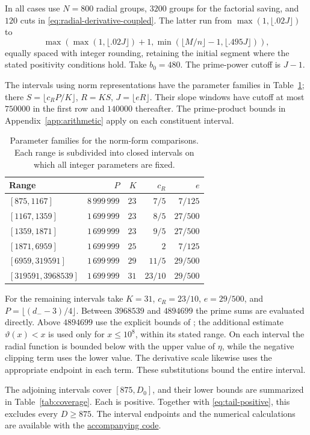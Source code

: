 In all cases use $N=800$ radial groups, $3200$ groups for the factorial
saving, and $120$ cuts in \eqref{eq:radial-derivative-coupled}.
The latter run from $\max(1,\lfloor.02J\rfloor)$ to
\[
 \max\left(\max(1,\lfloor.02J\rfloor)+1,
       \min(\lfloor M/n\rfloor-1,\lfloor.495J\rfloor)\right),
\]
equally spaced with integer rounding, retaining the initial segment
where the stated positivity conditions hold. Take $b_0=480$.
The prime-power cutoff is $J-1$.

The intervals using norm representations have the parameter families
in Table~\ref{tab:global-hybrid-parameters}; there
$S=\lfloor c_RP/K\rfloor$, $R=KS$, $J=\lfloor eR\rfloor$.
Their slope windows have cutoff at most $750000$ in the first row and
$140000$ thereafter. The prime-product bounds in Appendix~\ref{app:arithmetic}
apply on each constituent interval.
\begin{table}[ht]
\centering\small
\begin{tabular}{lrrrr}
\toprule
Range & $P$ & $K$ & $c_R$ & $e$\\
\midrule
$[875,1167]$ & $8\,999\,999$ & $23$ & $7/5$ & $7/125$\\
$[1167,1359]$ & $1\,699\,999$ & $23$ & $8/5$ & $27/500$\\
$[1359,1871]$ & $1\,699\,999$ & $23$ & $9/5$ & $27/500$\\
$[1871,6959]$ & $1\,699\,999$ & $25$ & $2$ & $7/125$\\
$[6959,319591]$ & $1\,699\,999$ & $29$ & $11/5$ & $29/500$\\
$[319591,3968539]$ & $1\,699\,999$ & $31$ & $23/10$ & $29/500$\\
\bottomrule
\end{tabular}
\caption{Parameter families for the norm-form comparisons. Each range is
subdivided into closed intervals on which all integer parameters are fixed.}
\label{tab:global-hybrid-parameters}
\end{table}

For the remaining intervals take $K=31$, $c_R=23/10$, $e=29/500$, and
$P=\lfloor(d_--3)/4\rfloor$. Between $3968539$ and $4894699$ the prime
sums are evaluated directly. Above $4894699$ use the explicit bounds of
\cite[Theorems 4, 6 and 18]{rosserschoenfeld}; the additional estimate
$\vartheta(x)<x$ is used only for $x\leq10^8$, within its stated range.
On each interval the radial function is bounded below with the upper
value of $\eta$, while the negative clipping term uses the lower value.
The derivative scale likewise uses the appropriate endpoint in each
term. These substitutions bound the entire interval.

The adjoining intervals cover $[875,D_0]$, and their lower bounds are
summarized in Table~\ref{tab:coverage}. Each is positive. Together with
\eqref{eq:tail-positive}, this excludes every $D\geq875$.
The interval endpoints and the numerical calculations are available with the
\href{https://github.com/dualverse-ai/tenth_discriminant/tree/main/bound-498/code}{accompanying code}.

